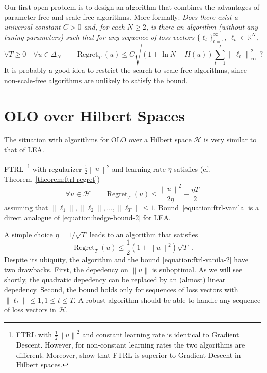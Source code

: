 \documentclass{colt2016} %
\DeclareMathOperator{\Regret}{Regret}
\newcommand{\R}{\mathbb{R}}     %
\renewcommand{\H}{\mathcal{H}}  %
\newcommand{\norm}[1]{\left\|{#1}\right\|}
\begin{document}
Our first open problem is to design an algorithm that combines the advantages
of parameter-free and scale-free algorithms. More formally: \emph{Does there
exist a universal constant $C > 0$ and, for each $N \ge 2$, is there an
algorithm (without any tuning parameters) such that for any sequence of loss
vectors $\{\ell_t\}_{t=1}^\infty$, $\ell_t \in \R^N$,}
$$
\forall T \ge 0 \quad \forall u \in \Delta_N \qquad \Regret_T(u) \le C \sqrt{(1 + \ln N - H(u)) \sum_{t=1}^T \norm{\ell_t}_\infty^2} \ \ ?
$$
It is probably a good idea to restrict the search to scale-free algorithms,
since non-scale-free algorithms are unlikely to satisfy the bound.

\section{OLO over Hilbert Spaces}

The situation with algorithms for OLO over a Hilbert space $\H$ is very similar
to that of LEA.

FTRL~\footnote{FTRL with $\frac{1}{2}\norm{u}^2$ and constant learning rate is
identical to Gradient Descent. However, for non-constant learning rates the two
algorithms are different.  Moreover, \cite{Orabona-Pal-2016-scale-free} show
that FTRL is superior to Gradient Descent in Hilbert spaces.} with regularizer
$\frac{1}{2}\norm{u}^2$ and learning rate $\eta$ satisfies (cf. Theorem~\ref{theorem:ftrl-regret})
\begin{equation}
\label{equation:ftrl-vanila}
\forall u \in \H \qquad \Regret_T(u) \le \frac{\norm{u}^2}{2\eta} + \frac{\eta T}{2}
\end{equation}
assuming that $\norm{\ell_1}, \norm{\ell_2}, \dots, \norm{\ell_T} \le 1$.
Bound~\eqref{equation:ftrl-vanila} is a direct analogue of
\eqref{equation:hedge-bound-2} for LEA.

A simple choice $\eta = 1/\sqrt{T}$ leads to an algorithm that satisfies
\begin{equation}
\label{equation:ftrl-vanila-2}
\Regret_T(u) \le \frac{1}{2}\left(1+\norm{u}^2\right)\sqrt{T} \; .
\end{equation}
Despite its ubiquity, the algorithm and the bound \eqref{equation:ftrl-vanila-2} have two
drawbacks. First, the depedency on $\norm{u}$ is suboptimal. As we will see
shortly, the quadratic depedency can be replaced by an (almost) linear
depedency.  Second, the bound holds only for sequences of loss vectors with $\norm{\ell_t} \le 1, 1\leq t\leq T$. A robust
algorithm should be able to handle any sequence of loss vectors in $\H$.
\end{document}
